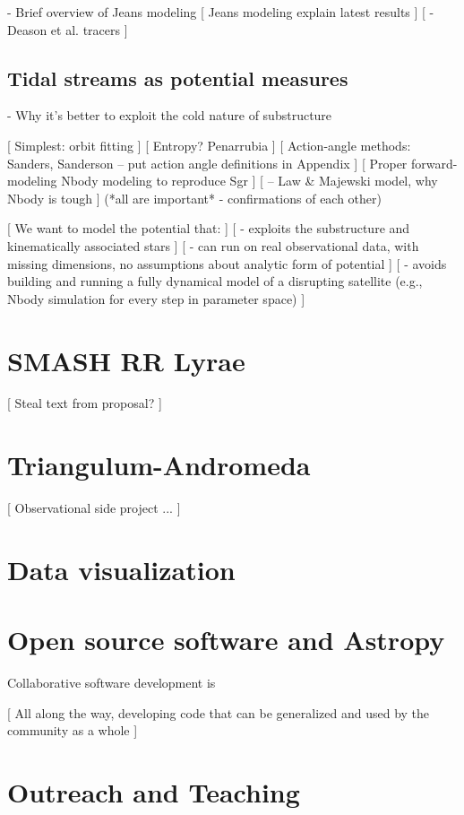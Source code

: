 \documentclass[letterpaper,12pt,preprint]{aastex}
\begin{document}
- Brief overview of Jeans modeling
[ Jeans modeling explain latest \cite{deason12} results ]
[ - Deason et al. tracers ]

\subsection{Tidal streams as potential measures}
- Why it's better to exploit the cold nature of substructure

[ Simplest: orbit fitting ]
[ Entropy? Penarrubia ]
[ Action-angle methods: Sanders, Sanderson -- put action angle definitions in Appendix ]
[ Proper forward-modeling Nbody modeling to reproduce Sgr ]
[ -- Law \& Majewski model, why Nbody is tough ]
(*all are important* - confirmations of each other)

[ We want to model the potential that: ]
[ - exploits the substructure and kinematically associated stars ]
[ - can run on real observational data, with missing dimensions, no assumptions about analytic form of potential ]
[ - avoids building and running a fully dynamical model of a disrupting satellite (e.g., Nbody simulation for every step in parameter space) ]

\section{SMASH RR Lyrae}

[ Steal text from proposal? ]

\section{Triangulum-Andromeda}

[ Observational side project ... ]

\section{Data visualization}

\section{Open source software and Astropy}

Collaborative software development is 

[ All along the way, developing code that can be generalized and used by the community as a whole ]

\section{Outreach and Teaching}
\end{document}
